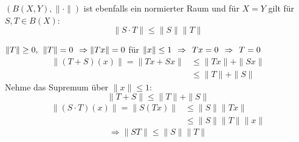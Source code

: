 \begin{satz}
 	$(B(X, Y), \| \cdot \|)$ ist ebenfalls ein normierter Raum und für $X = Y$ gilt für $S, T \in B(X)$:
 	\[ \| S \cdotp T \| \leq \| S \| \| T \| \]
\end{satz}

\begin{beweis}
	$\| T \| \geq 0, \hspace{0.15cm} \| T \| = 0 \hspace{0.15cm} \Rightarrow \| Tx \| = 0$ für $\| x \| \leq 1 \hspace{0.15cm} \Rightarrow \hspace{0.15cm} Tx = 0 \hspace{0.15cm} \Rightarrow \hspace{0.15cm} T = 0$ \\
	\begin{align*}
		\| ( T + S )(x) \| = \| Tx + Sx \| &\leq \| Tx \| + \| Sx \| \\
										   &\leq \| T \| + \| S \|
	\end{align*}
	Nehme das Supremum über $\| x \| \leq 1$:
	\[ \| T + S \| \leq \| T \| + \| S \| \]
	\begin{align*}
		\| ( S \cdot T )(x) \| = \| S(Tx) \| & \leq \| S \| \| Tx \| \\
													 & \leq \| S \| \| T \| \| x \|
	\end{align*}
	\[ \Rightarrow \| S T \| \leq \| S \| \| T \| \]
\end{beweis}


